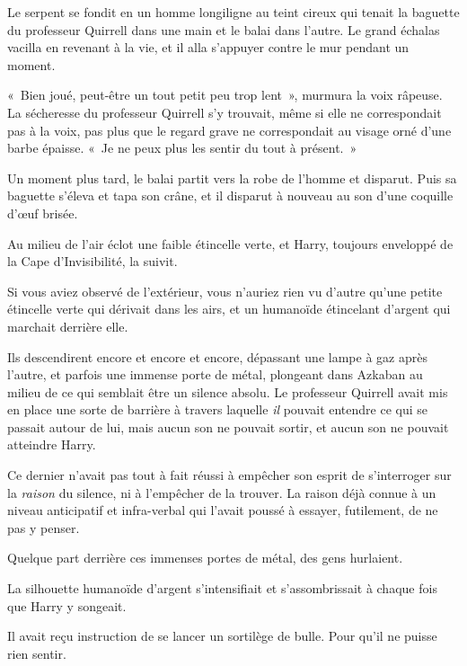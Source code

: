 Le serpent se fondit en un homme longiligne au teint cireux qui tenait la baguette du professeur Quirrell dans une main et le balai dans l'autre. Le grand échalas vacilla en revenant à la vie, et il alla s'appuyer contre le mur pendant un moment.

«~Bien joué, peut-être un tout petit peu trop lent~», murmura la voix râpeuse. La sécheresse du professeur Quirrell s'y trouvait, même si elle ne correspondait pas à la voix, pas plus que le regard grave ne correspondait au visage orné d'une barbe épaisse. «~Je ne peux plus les sentir du tout à présent.~»

Un moment plus tard, le balai partit vers la robe de l'homme et disparut. Puis sa baguette s'éleva et tapa son crâne, et il disparut à nouveau au son d'une coquille d'œuf brisée.

Au milieu de l'air éclot une faible étincelle verte, et Harry, toujours enveloppé de la Cape d'Invisibilité, la suivit.

Si vous aviez observé de l'extérieur, vous n'auriez rien vu d'autre qu'une petite étincelle verte qui dérivait dans les airs, et un humanoïde étincelant d'argent qui marchait derrière elle.

\later

Ils descendirent encore et encore et encore, dépassant une lampe à gaz après l'autre, et parfois une immense porte de métal, plongeant dans Azkaban au milieu de ce qui semblait être un silence absolu. Le professeur Quirrell avait mis en place une sorte de barrière à travers laquelle \emph{il} pouvait entendre ce qui se passait autour de lui, mais aucun son ne pouvait sortir, et aucun son ne pouvait atteindre Harry.

Ce dernier n'avait pas tout à fait réussi à empêcher son esprit de s'interroger sur la \emph{raison} du silence, ni à l'empêcher de la trouver. La raison déjà connue à un niveau anticipatif et infra-verbal qui l'avait poussé à essayer, futilement, de ne pas y penser.

Quelque part derrière ces immenses portes de métal, des gens hurlaient.

La silhouette humanoïde d'argent s'intensifiait et s'assombrissait à chaque fois que Harry y songeait.

Il avait reçu instruction de se lancer un sortilège de bulle. Pour qu'il ne puisse rien sentir.


